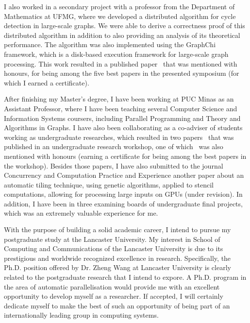 \documentclass{article}
\begin{document}
I also worked in a secondary project with a professor from the Department of
Mathematics at UFMG, where we developed a distributed algorithm for cycle
detection in large-scale graphs. We were able to derive a correctness proof of
this distributed algorithm in addition to also providing an analysis of its
theoretical performance.  The algorithm was also implemented using the GraphChi
framework, which is a disk-based execution framework for large-scale graph
processing. This work resulted in a published paper~\cite{rocha2015cycles} that
was mentioned with honours, for being among the five best papers in the
presented symposium (for which I earned a certificate).

After finishing my Master's degree, I have been working at PUC Minas as an
Assistant Professor, where I have been teaching several Computer Science and
Information Systems coursers, including Parallel Programming and Theory and
Algorithms in Graphs.  I have also been collaborating as a co-adviser of
students working as undergraduate researches, which resulted in two
papers~\cite{saffran2015apriori,pereira2015stencilbench} that was published in
an undergraduate research workshop, one of which~\cite{pereira2015stencilbench}
was also mentioned with honours (earning a certificate for being among the best
papers in the workshop). Besides those papers, I have also submitted to the
journal Concurrency and Computation Practice and Experience another paper about
an automatic tiling technique, using genetic algorithms, applied to stencil
computations, allowing for processing large inputs on GPUs (under revision).
In addition, I have been in three examining boards of undergraduate final
projects, which was an extremely valuable experience for me.


With the purpose of building a solid academic career, I intend to pursue my
postgraduate study at the Lancaster University.  My interest in School of
Computing and Communications of the Lancaster University is due to its
prestigious and worldwide recognized excellence in research.  Specifically, the
Ph.D. position offered by Dr. Zheng Wang at Lancaster University is clearly
related to the postgraduate research that I intend to expore.  A Ph.D. program
in the area of automatic parallelisation would provide me with an excellent
opportunity to develop myself as a researcher.
If accepted, I will certainly dedicate myself to make the best of such an
opportunity of being part of an internationally leading group in computing
systems.

\nocite{*}


\end{document}
